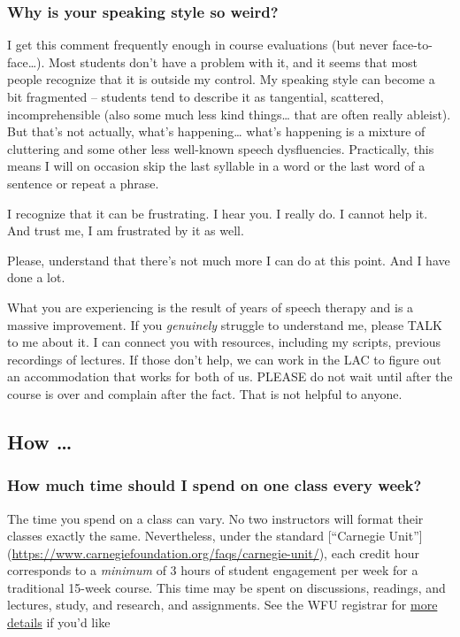\documentclass[
]{book}
\begin{document}
\hypertarget{why-is-your-speaking-style-so-weird}{%
\subsubsection{Why is your speaking style so weird?}\label{why-is-your-speaking-style-so-weird}}

I get this comment frequently enough in course evaluations (but never face-to-face\ldots). Most students don't have a problem with it, and it seems that most people recognize that it is outside my control. My speaking style can become a bit fragmented -- students tend to describe it as tangential, scattered, incomprehensible (also some much less kind things\ldots{} that are often really ableist). But that's not actually, what's happening\ldots{} what's happening is a mixture of cluttering and some other less well-known speech dysfluencies. Practically, this means I will on occasion skip the last syllable in a word or the last word of a sentence or repeat a phrase.

I recognize that it can be frustrating. I hear you. I really do. I cannot help it. And trust me, I am frustrated by it as well.

Please, understand that there's not much more I can do at this point. And I have done a lot.

What you are experiencing is the result of years of speech therapy and is a massive improvement. If you \emph{genuinely} struggle to understand me, please TALK to me about it. I can connect you with resources, including my scripts, previous recordings of lectures. If those don't help, we can work in the LAC to figure out an accommodation that works for both of us. PLEASE do not wait until after the course is over and complain after the fact. That is not helpful to anyone.

\hypertarget{how}{%
\subsection{How \ldots{}}\label{how}}

\hypertarget{how-much-time-should-i-spend-on-one-class-every-week}{%
\subsubsection{How much time should I spend on one class every week?}\label{how-much-time-should-i-spend-on-one-class-every-week}}

The time you spend on a class can vary. No two instructors will format their classes exactly the same. Nevertheless, under the standard {[}``Carnegie Unit''{]} (\url{https://www.carnegiefoundation.org/faqs/carnegie-unit/}), each credit hour corresponds to a \emph{minimum} of 3 hours of student engagement per week for a traditional 15-week course. This time may be spent on discussions, readings, and lectures, study, and research, and assignments. See the WFU registrar for \href{https://registrar.wfu.edu/semester-credit-hour/}{more details} if you'd like
\end{document}
